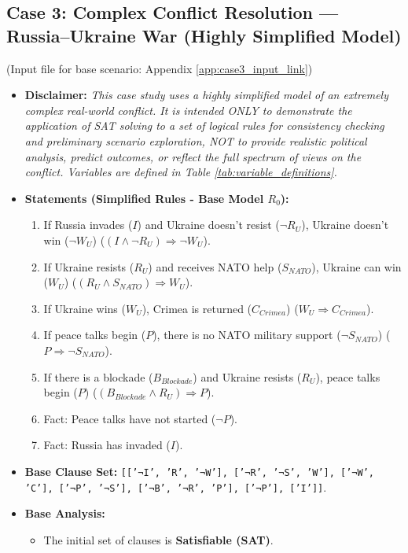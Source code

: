 \documentclass[11pt, a4paper]{article}
\begin{document}
\subsection*{Case 3: Complex Conflict Resolution — Russia–Ukraine War (Highly Simplified Model)}
(Input file for base scenario: Appendix \ref{app:case3_input_link})
\begin{itemize}
    \item \textbf{Disclaimer:} \textit{This case study uses a highly simplified model of an extremely complex real-world conflict. It is intended ONLY to demonstrate the application of SAT solving to a set of logical rules for consistency checking and preliminary scenario exploration, NOT to provide realistic political analysis, predict outcomes, or reflect the full spectrum of views on the conflict. Variables are defined in Table \ref{tab:variable_definitions}.}
    \item \textbf{Statements (Simplified Rules - Base Model $R_0$):}
    \begin{enumerate}
        \item If Russia invades ($I$) and Ukraine doesn't resist ($\neg R_U$), Ukraine doesn't win ($\neg W_U$) ($(I \wedge \neg R_U) \Rightarrow \neg W_U$).
        \item If Ukraine resists ($R_U$) and receives NATO help ($S_{NATO}$), Ukraine can win ($W_U$) ($(R_U \wedge S_{NATO}) \Rightarrow W_U$).
        \item If Ukraine wins ($W_U$), Crimea is returned ($C_{Crimea}$) ($W_U \Rightarrow C_{Crimea}$).
        \item If peace talks begin ($P$), there is no NATO military support ($\neg S_{NATO}$) ($P \Rightarrow \neg S_{NATO}$).
        \item If there is a blockade ($B_{Blockade}$) and Ukraine resists ($R_U$), peace talks begin ($P$) ($(B_{Blockade} \wedge R_U) \Rightarrow P$).
        \item Fact: Peace talks have not started ($\neg P$).
        \item Fact: Russia has invaded ($I$).
    \end{enumerate}
    \item \textbf{Base Clause Set:} \texttt{[['¬I', 'R', '¬W'], ['¬R', '¬S', 'W'], ['¬W', 'C'], ['¬P', '¬S'], ['¬B', '¬R', 'P'], ['¬P'], ['I']]}.
    \item \textbf{Base Analysis:}
        \begin{itemize}
            \item The initial set of clauses is \textbf{Satisfiable (SAT)}.

\end{itemize}
\end{itemize}
\end{document}
